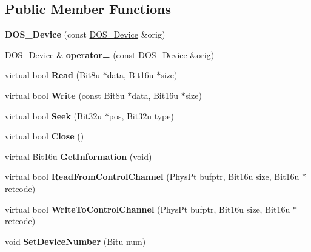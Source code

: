 \subsection*{Public Member Functions}
\begin{DoxyCompactItemize}
\item 
\hypertarget{classDOS__Device_ad955e1e07cfe5bb6c3aca63cbb897db3}{{\bfseries D\-O\-S\-\_\-\-Device} (const \hyperlink{classDOS__Device}{D\-O\-S\-\_\-\-Device} \&orig)}\label{classDOS__Device_ad955e1e07cfe5bb6c3aca63cbb897db3}

\item 
\hypertarget{classDOS__Device_aec249c3f09306a702e292a5f9f64c96b}{\hyperlink{classDOS__Device}{D\-O\-S\-\_\-\-Device} \& {\bfseries operator=} (const \hyperlink{classDOS__Device}{D\-O\-S\-\_\-\-Device} \&orig)}\label{classDOS__Device_aec249c3f09306a702e292a5f9f64c96b}

\item 
\hypertarget{classDOS__Device_a87e1322f373b3d9358ccd165c0bdb750}{virtual bool {\bfseries Read} (Bit8u $\ast$data, Bit16u $\ast$size)}\label{classDOS__Device_a87e1322f373b3d9358ccd165c0bdb750}

\item 
\hypertarget{classDOS__Device_a3b63dcb9947772b28fd67b695ecf7c49}{virtual bool {\bfseries Write} (const Bit8u $\ast$data, Bit16u $\ast$size)}\label{classDOS__Device_a3b63dcb9947772b28fd67b695ecf7c49}

\item 
\hypertarget{classDOS__Device_a8d5e83453557f33179f118808d4e3d5b}{virtual bool {\bfseries Seek} (Bit32u $\ast$pos, Bit32u type)}\label{classDOS__Device_a8d5e83453557f33179f118808d4e3d5b}

\item 
\hypertarget{classDOS__Device_a75ab586e87f58a6474f69064d417e8d7}{virtual bool {\bfseries Close} ()}\label{classDOS__Device_a75ab586e87f58a6474f69064d417e8d7}

\item 
\hypertarget{classDOS__Device_acd253fc52af9dca4c5aac3a471e59b00}{virtual Bit16u {\bfseries Get\-Information} (void)}\label{classDOS__Device_acd253fc52af9dca4c5aac3a471e59b00}

\item 
\hypertarget{classDOS__Device_ad64f103256041be936e917a6f9ffb863}{virtual bool {\bfseries Read\-From\-Control\-Channel} (Phys\-Pt bufptr, Bit16u size, Bit16u $\ast$retcode)}\label{classDOS__Device_ad64f103256041be936e917a6f9ffb863}

\item 
\hypertarget{classDOS__Device_afbf53e55c13effffa2168cc095eb906e}{virtual bool {\bfseries Write\-To\-Control\-Channel} (Phys\-Pt bufptr, Bit16u size, Bit16u $\ast$retcode)}\label{classDOS__Device_afbf53e55c13effffa2168cc095eb906e}

\item 
\hypertarget{classDOS__Device_adf2a68f874fd5bd4ef6160dc48ef3f9d}{void {\bfseries Set\-Device\-Number} (Bitu num)}\label{classDOS__Device_adf2a68f874fd5bd4ef6160dc48ef3f9d}

\end{DoxyCompactItemize}


